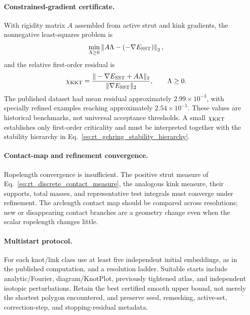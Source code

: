\paragraph{Constrained-gradient certificate.}
With rigidity matrix $A$ assembled from active strut and kink gradients, the
nonnegative least-squares problem is
\begin{align}
    \min_{\Lambda\ge0}
    \left\|A\Lambda-(-\nabla E_{\rm SST})\right\|_2,
    \label{eq:rt_ridgerunner_nnls}
\end{align}
and the relative first-order residual is
\begin{align}
    \chi_{\rm KKT}
    =
    \frac{\|-\nabla E_{\rm SST}+A\Lambda\|_2}
         {\|\nabla E_{\rm SST}\|_2},
    \qquad \Lambda\ge0 .
    \label{eq:rt_contact_residual}
\end{align}
The published dataset had mean residual approximately $2.99\times10^{-3}$,
with specially refined examples reaching approximately
$2.54\times10^{-5}$.  These values are historical benchmarks, not universal
acceptance thresholds.  A small $\chi_{\rm KKT}$ establishes only first-order
criticality and must be interpreted together with the stability hierarchy in
Eq.~\eqref{eq:rt_gehring_stability_hierarchy}.

\paragraph{Contact-map and refinement convergence.}
Ropelength convergence is insufficient.  The positive strut measure of
Eq.~\eqref{eq:rt_discrete_contact_measure}, the analogous kink measure, their
supports, total masses, and representative test integrals must converge under
refinement.  The arclength contact map should be compared across resolutions;
new or disappearing contact branches are a geometry change even when the
scalar ropelength changes little.

\paragraph{Multistart protocol.}
For each knot/link class use at least five independent initial embeddings, as
in the published computation, and a resolution ladder.  Suitable starts
include analytic/Fourier, diagram/KnotPlot, previously tightened atlas, and
independent isotopic perturbations.  Retain the best certified smooth upper
bound, not merely the shortest polygon encountered, and preserve seed,
remeshing, active-set, correction-step, and stopping-residual metadata.

